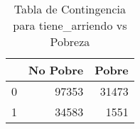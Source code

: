 \begin{table}[ht]
\centering
\begin{tabular}{rrr}
  \toprule
 & No Pobre & Pobre \\ 
  \midrule
0 & 97353 & 31473 \\ 
  1 & 34583 & 1551 \\ 
   \bottomrule
\end{tabular}
\caption{Tabla de Contingencia para tiene_arriendo vs Pobreza} 
\label{tab:contingency_tiene_arriendo}
\end{table}
